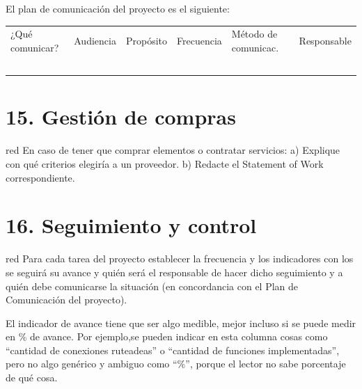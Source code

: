 \documentclass[11pt]{charter}
\begin{document}
El plan de comunicación del proyecto es el siguiente:

\begin{table}[htpb]
\centering
\begin{tabularx}{\linewidth}{@{}|X|C{2.4cm}|C{3cm}|C{1.8cm}|C{2cm}|C{2.1cm}|@{}}
\hline
{} 
           \\ \hline
{} 
¿Qué comunicar? & Audiencia & Propósito & Frecuencia & Método de comunicac. & Responsable \\ \hline
                &           &           &            &                      &             \\ \hline
                &           &           &            &                      &             \\ \hline
                &           &           &            &                      &             \\ \hline
                &           &           &            &                      &             \\ \hline
                &           &           &            &                      &             \\ \hline
\end{tabularx}
\end{table}

\section{15. Gestión de compras}
\label{sec:compras}

\begin{consigna}{red}
En caso de tener que comprar elementos o contratar servicios:
a) Explique con qué criterios elegiría a un proveedor.
b) Redacte el Statement of Work correspondiente.
\end{consigna}

\section{16. Seguimiento y control}
\label{sec:seguimiento}

\begin{consigna}{red}
Para cada tarea del proyecto establecer la frecuencia y los indicadores con los se seguirá su avance y quién será el responsable de hacer dicho seguimiento y a quién debe comunicarse la situación (en concordancia con el Plan de Comunicación del proyecto).

El indicador de avance tiene que ser algo medible, mejor incluso si se puede medir en \% de avance. Por ejemplo,se pueden indicar en esta columna cosas como ``cantidad de conexiones ruteadeas'' o ``cantidad de funciones implementadas'', pero no algo genérico y ambiguo como ``\%'', porque el lector no sabe porcentaje de qué cosa.

\end{consigna}
\end{document}
